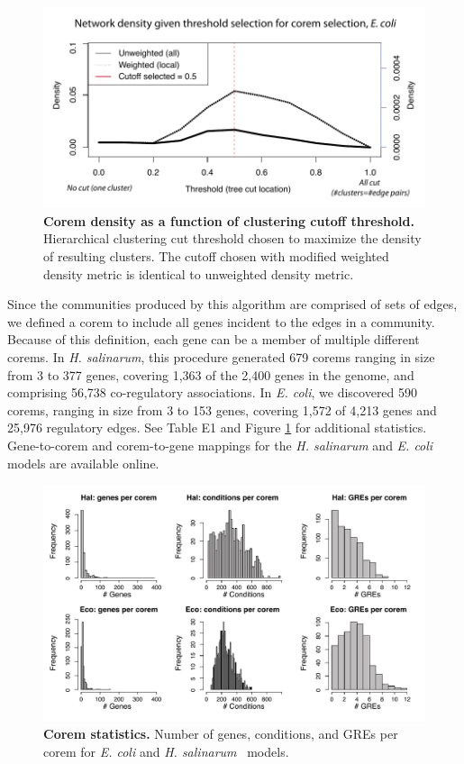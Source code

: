 \begin{figure}[h!]
\centering
\includegraphics[width=0.9\linewidth]{figures/corem_density.pdf}
\caption[Corem density as a function of clustering cutoff threshold]{
{\bf Corem density as a function of clustering cutoff threshold.}
Hierarchical clustering cut threshold chosen to maximize the density
of resulting clusters. The cutoff chosen with modified weighted
density metric is identical to unweighted density metric.}
\label{fig:corem_density}
\end{figure}

Since the communities produced by this algorithm are comprised of sets
of edges, we defined a corem to include all genes incident to the
edges in a community. Because of this definition, each gene can be a
member of multiple different corems. In {\it H. salinarum}, this
procedure generated 679 corems ranging in size from 3 to 377 genes,
covering 1,363 of the 2,400 genes in the genome, and comprising 56,738
co-regulatory associations. In {\it E. coli}, we discovered 590
corems, ranging in size from 3 to 153 genes, covering 1,572 of 4,213
genes and 25,976 regulatory edges. See Table E1 and
Figure \ref{fig:corem_density} for additional
statistics. Gene-to-corem and corem-to-gene mappings for the {\it
H. salinarum} and {\it E. coli} models are available online.

\begin{figure}[h!]
\centering
\includegraphics[width=0.9\linewidth]{figures/corem_stats.pdf}
\caption[Corem statistics]{
{\bf Corem statistics.} Number of genes, conditions, and GREs per
corem for \textit{E. coli} and \textit{H. salinarum} \egrine~models.}
\label{fig:corem_stats}
\end{figure}
